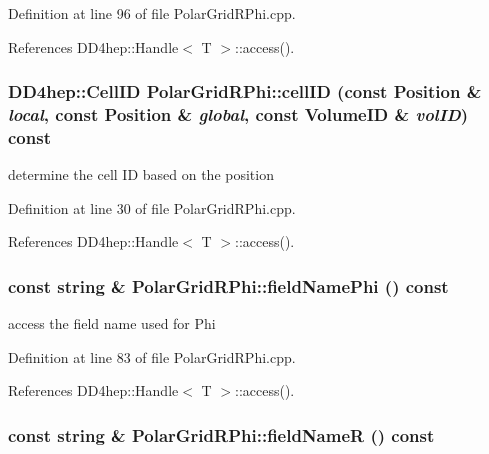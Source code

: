 Definition at line 96 of file PolarGridRPhi.cpp.

References DD4hep::Handle$<$ T $>$::access().\hypertarget{class_d_d4hep_1_1_geometry_1_1_polar_grid_r_phi_a406273afad3c872baf560df87f18c85f}{
\subsubsection[{cellID}]{\setlength{\rightskip}{0pt plus 5cm}DD4hep::CellID PolarGridRPhi::cellID (const {\bf Position} \& {\em local}, \/  const {\bf Position} \& {\em global}, \/  const VolumeID \& {\em volID}) const}}
\label{class_d_d4hep_1_1_geometry_1_1_polar_grid_r_phi_a406273afad3c872baf560df87f18c85f}


determine the cell ID based on the position 

Definition at line 30 of file PolarGridRPhi.cpp.

References DD4hep::Handle$<$ T $>$::access().\hypertarget{class_d_d4hep_1_1_geometry_1_1_polar_grid_r_phi_a2492901ca52f27c791de76f796c9665b}{
\subsubsection[{fieldNamePhi}]{\setlength{\rightskip}{0pt plus 5cm}const {\bf string} \& PolarGridRPhi::fieldNamePhi () const}}
\label{class_d_d4hep_1_1_geometry_1_1_polar_grid_r_phi_a2492901ca52f27c791de76f796c9665b}


access the field name used for Phi 

Definition at line 83 of file PolarGridRPhi.cpp.

References DD4hep::Handle$<$ T $>$::access().\hypertarget{class_d_d4hep_1_1_geometry_1_1_polar_grid_r_phi_a1d88df579d6642d27b5ee7ee16a946f4}{
\subsubsection[{fieldNameR}]{\setlength{\rightskip}{0pt plus 5cm}const {\bf string} \& PolarGridRPhi::fieldNameR () const}}
\label{class_d_d4hep_1_1_geometry_1_1_polar_grid_r_phi_a1d88df579d6642d27b5ee7ee16a946f4}


